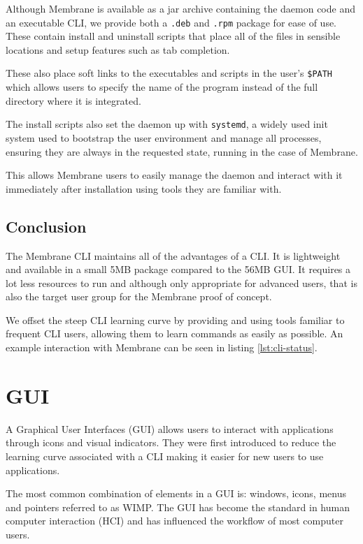 \documentclass[11pt, a4paper, twoside]{report}
\def\code#1{\texttt{#1}}
\begin{document}
Although Membrane is available as a jar archive containing the daemon code and an executable CLI, we provide both a \code{.deb} and \code{.rpm} package for ease of use. These contain install and uninstall scripts that place all of the files in sensible locations and setup features such as tab completion.

These also place soft links to the executables and scripts in the user's \code{\$PATH} which allows users to specify the name of the program instead of the full directory where it is integrated.

The install scripts also set the daemon up with \code{systemd}, a widely used init system \citep{saunders2015systemd} used to bootstrap the user environment and manage all processes, ensuring they are always in the requested state, running in the case of Membrane.

This allows Membrane users to easily manage the daemon and interact with it immediately after installation using tools they are familiar with.

\subsection{Conclusion}

The Membrane CLI maintains all of the advantages of a CLI. It is lightweight and available in a small 5MB package compared to the 56MB GUI. It requires a lot less resources to run and although only appropriate for advanced users, that is also the target user group for the Membrane proof of concept.

We offset the steep CLI learning curve by providing and using tools familiar to frequent CLI users, allowing them to learn commands as easily as possible. An example interaction with Membrane can be seen in listing \ref{lst:cli-status}.

\section{GUI}

A Graphical User Interfaces (GUI) allows users to interact with applications through icons and visual indicators. They were first introduced to reduce the learning curve associated with a CLI \citep{linfo2004gui} making it easier for new users to use applications.

The most common combination of elements in a GUI is: windows, icons, menus and pointers referred to as WIMP. \citep{van1997post} The GUI has become the standard in human computer interaction (HCI) and has influenced the workflow of most computer users.
\end{document}
